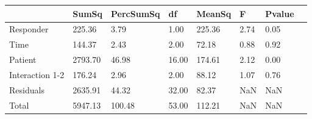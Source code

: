 \begin{tabular}{llllllll}
 & SumSq & PercSumSq & df & MeanSq & F & Pvalue \\ 
 \hline 
Responder & 225.36 & 3.79 & 1.00 & 225.36 & 2.74 & 0.05 \\ 
Time & 144.37 & 2.43 & 2.00 & 72.18 & 0.88 & 0.92 \\ 
Patient & 2793.70 & 46.98 & 16.00 & 174.61 & 2.12 & 0.00 \\ 
Interaction 1-2 & 176.24 & 2.96 & 2.00 & 88.12 & 1.07 & 0.76 \\ 
Residuals & 2635.91 & 44.32 & 32.00 & 82.37 & NaN & NaN \\ 
Total & 5947.13 & 100.48 & 53.00 & 112.21 & NaN & NaN \\ 
\end{tabular} 
